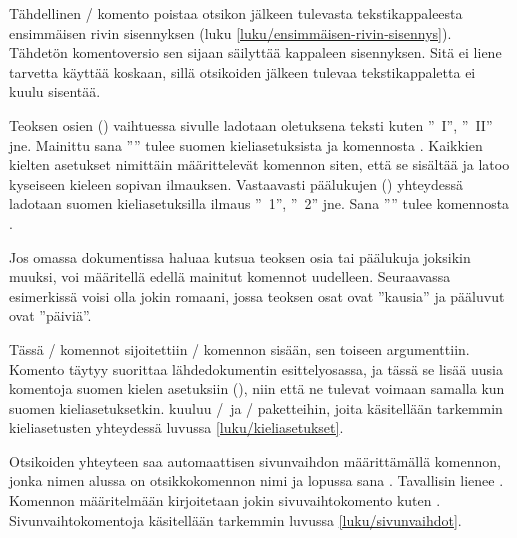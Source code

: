 \noindent
Tähdellinen \-/ komento poistaa otsikon jälkeen
tulevasta tekstikappaleesta ensimmäisen rivin sisennyksen (luku
\ref{luku/ensimmäisen-rivin-sisennys}). Tähdetön komentoversio
 sen sijaan säilyttää kappaleen sisennyksen. Sitä
ei liene tarvetta käyttää koskaan, sillä otsikoiden jälkeen tulevaa
tekstikappaletta ei kuulu sisentää.

Teoksen osien () vaihtuessa sivulle ladotaan oletuksena
teksti kuten ''\partname~I'', ''\partname~II'' jne. Mainittu sana
''\partname'' tulee suomen kieliasetuksista ja komennosta
. Kaikkien kielten asetukset nimittäin määrittelevät
komennon  siten, että se sisältää ja latoo kyseiseen
kieleen sopivan ilmauksen. Vastaavasti päälukujen ()
yhteydessä ladotaan suomen kieliasetuksilla ilmaus ''\chaptername~1'',
''\chaptername~2'' jne. Sana ''\chaptername'' tulee komennosta
.

Jos omassa dokumentissa haluaa kutsua teoksen osia tai päälukuja
joksikin muuksi, voi määritellä edellä mainitut komennot uudelleen.
Seuraavassa esimerkissä voisi olla jokin romaani, jossa teoksen osat
ovat ''kausia'' ja pääluvut ovat ''päiviä''.

\begin{koodilohkosis}
\addto{\captionsfinnish}{
  \renewcommand{\partname}{Kausi}
  \renewcommand{\chaptername}{Päivä}
}
\end{koodilohkosis}

\noindent
Tässä \-/ komennot sijoitettiin \-/
komennon sisään, sen toiseen argumenttiin. Komento 
täytyy suorittaa lähdedokumentin esittelyosassa, ja tässä se lisää uusia
komentoja suomen kielen asetuksiin (), niin
että ne tulevat voimaan samalla kun suomen kieliasetuksetkin.
 kuuluu \-/\ ja \-/
paketteihin, joita käsitellään tarkemmin kieliasetusten yhteydessä
luvussa \ref{luku/kieliasetukset}.

Otsikoiden yhteyteen saa automaattisen sivunvaihdon määrittämällä
komennon, jonka nimen alussa on otsikkokomennon nimi ja lopussa sana
. Tavallisin lienee . Komennon
määritelmään kirjoitetaan jokin sivuvaihtokomento kuten
. Sivunvaihtokomentoja käsitellään tarkemmin luvussa
\ref{luku/sivunvaihdot}.

